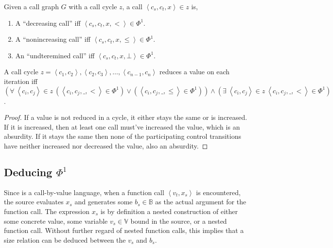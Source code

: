 \begin{definition}\label{definition:increasing-decreasing-call} Given a call
graph $G$ with a call cycle $z$, a call $\left\langle c_s,c_t,x\right\rangle\in
z$ is,

\begin{enumerate}

\item A ``decreasing call'' iff $\left\langle c_s,c_t,x,< \right\rangle \in
\Phi^1$.

\item A ``nonincreasing call'' iff $\left\langle c_s,c_t,x,\leq \right\rangle
\in \Phi^1$.

\item An ``undteremined call'' iff $\left\langle c_s,c_t,x,\bot \right\rangle
\in \Phi^1$.

\end{enumerate}

\end{definition}

\begin{lemma}\label{lemma:cycle-reduce} A call cycle $z= \left\langle c_1,c_2
\right\rangle, \left\langle c_2, c_3 \right\rangle,\ldots, \left\langle
c_{n-1}, c_n \right\rangle$ reduces a value on each iteration iff
$$\left(\forall\ \left\langle c_i,c_j \right\rangle \in z\ \left(\left\langle
c_i,c_j,\_, < \right\rangle \in \Phi^1\right) \vee \left(\left\langle
c_i,c_j,\_, \leq \right\rangle \in \Phi^1 \right)\right)\wedge \left( \exists\
\left\langle c_i,c_j \right\rangle \in z\ \left\langle c_i,c_j,\_, <
\right\rangle \in \Phi^1 \right)$$.\end{lemma}

\begin{proof} If a value is not reduced in a cycle, it either stays the same or
is increased. If it is increased, then at least one call must've increased the
value, which is an absurdity. If it stays the same then none of the
participating control transitions have neither increased nor decreased the
value, also an absurdity.\end{proof}

\subsection{Deducing $\Phi^1$}

Since \D{} is a call-by-value language, when a function call $\left\langle
v_t,x_s \right\rangle$ is encountered, the source evaluates $x_s$ and generates
some $b_s\in\mathbb{B}$ as the actual argument for the function call. The
expression $x_s$ is by definition a nested construction of either some concrete
value, some variable $v_s\in\mathbb{V}$ bound in the source, or a nested
function call. Without further regard of nested function calls, this implies
that a size relation can be deduced between the $v_s$ and $b_s$.

